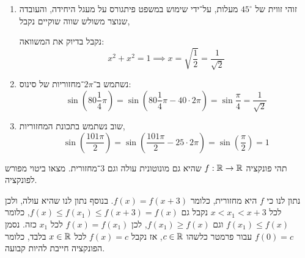 \begin{solution}
	\begin{enumerate}
		\item זוהי זווית של $45^\circ$ מעלות, על־ידי שימוש במשפט פיתגורס על מעגל היחידה, והעובדה שנוצר משולש שווה שוקיים נקבל,
			\begin{otherlanguage}{english}
				\begin{center}
				\end{center}
			\end{otherlanguage}
			נקבל בדיוק את המשוואה:
			\[
				x^2 + x^2 = 1
				\implies x = \sqrt{\frac{1}{2}} = \frac{1}{\sqrt{2}}
			\]
		\item נשתמש ב־$2 \pi$־מחזוריות של סינוס:
			\[
				\sin(80 \frac{1}{4} \pi)
				= \sin(80 \frac{1}{4} \pi - 40 \cdot 2 \pi)
				= \sin \frac{\pi}{4}
				= \frac{1}{\sqrt{2}}
			\]
		\item שוב נשתמש בתכונת המחזוריות,
			\[
				\sin(\frac{101 \pi}{2})
				= \sin(\frac{101 \pi}{2} - 25 \cdot 2 \pi)
				= \sin(\frac{\pi}{2})
				= 1
			\]
	\end{enumerate}
\end{solution}
\begin{exercise}
	תהי פונקציה $f : \mathbb{R} \to \mathbb{R}$ שהיא גם מונוטונית עולה וגם $3$־מחזורית.
	מצאו ביטוי מפורש לפונקציה.
\end{exercise}
\begin{solution}
	נתון לנו כי $f$ היא מחזורית, כלומר $f(x) = f(x + 3)$.
	בנוסף נתון לנו שהיא עולה, ולכן לכל $x < x_1 < x + 3$ נקבל גם $f(x) \le f(x_1) \le f(x + 3) = f(x)$, כלומר $f(x_1) \le f(x)$ וגם $f(x_1) \ge f(x)$, לכן $f(x) = f(x_1)$ לכל $x_1$ כזה.
	נסמן $f(0) = c$ עבור פרמטר כלשהו $c \in \mathbb{R}$, אז נקבל $f(x) = c$ לכל $x \in \mathbb{R}$ בלבד, כלומר הפונקציה חייבת להיות קבועה.
\end{solution}


